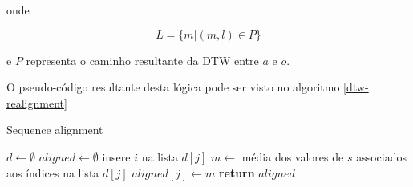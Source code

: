 \noindent onde

\begin{equation*}
  L = \{m | (m, l) \in P\}
\end{equation*}

\noindent e $P$ representa o caminho resultante da DTW entre $a$ e $o$.

O pseudo-código resultante desta lógica pode ser visto no algoritmo \ref{dtw-realignment}

\begin{algorithm}[H]
\caption{Sequence alignment}\label{dtw-realignment}
\begin{algorithmic}[1]
    \State $d \gets \emptyset$ 
    \State $aligned \gets \emptyset$
        \State insere $i$ na lista $d[j]$
    \EndFor
        \State $m \gets$ média dos valores de $s$ associados aos índices na lista $d[j]$
        \State $aligned[j] \gets m$
    \EndFor
\State \textbf{return} $aligned$
\EndProcedure
\end{algorithmic}
\end{algorithm}
